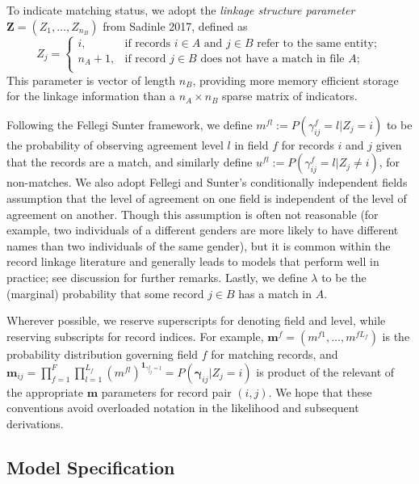 \documentclass[12pt,letterpaper]{article}
\newcommand{\1}[1]{\mathbb{I}\!\left[#1\right]} %
\begin{document}
To indicate matching status, we adopt the \emph{linkage structure
	parameter} \(\mathbf{Z} = (Z_1, \ldots, Z_{n_B})\) from Sadinle 2017,
defined as \[Z_j=\begin{cases} 
	i,  & \text{if records } i\in A \text{ and } j\in B \text{ refer to the same entity}; \\
	n_A + 1,  & \text{if record } j\in B \text{ does not have a match in file } A; \\
\end{cases}\] This parameter is vector of length $n_B$, providing more memory efficient storage for the
linkage information than a \(n_A \times n_B\) sparse matrix of
indicators.

Following the Fellegi Sunter framework, we define
\(m^{fl}:= P(\gamma_{ij}^f = l |Z_j = i)\) to be the probability of
observing agreement level \(l\) in field \(f\) for records \(i\) and
\(j\) given that the records are a match, and similarly define
\(u^{fl}:= P(\gamma_{ij}^f = l |Z_j \neq i)\), for non-matches. We also
adopt Fellegi and Sunter's conditionally independent fields assumption
that the level of agreement on one field is independent of the level of
agreement on another. Though this assumption is often not reasonable
(for example, two individuals of a different genders are more likely to have different names than two individuals of the same gender),
but it is common within the record linkage literature and generally
leads to models that perform well in practice; see discussion for
further remarks. Lastly, we define \(\lambda\) to be the (marginal)
probability that some record \(j \in B\) has a match in \(A\).

Wherever possible, we reserve superscripts for denoting field and level,
while reserving subscripts for record indices. For example,
\(\mathbf{m}^f = (m^{f1}, \ldots, m^{fL_f})\) is the probability
distribution governing field \(f\) for matching records, and
\(\mathbf{m}_{ij}= \prod_{f=1}^{F}\prod_{l=1}^{L_f} \left(m^{fl}\right)^{\mathbf{1}_{\gamma_{ij}^f = l}} = P(\boldsymbol{\gamma}_{ij}|Z_j = i)\)
is product of the relevant of the appropriate \(\mathbf{m}\) parameters
for record pair \((i,j)\). We hope that these conventions avoid
overloaded notation in the likelihood and subsequent derivations.

\hypertarget{model-specification}{%
	\subsection{Model Specification}
	\label{model-specification}}
\end{document}

